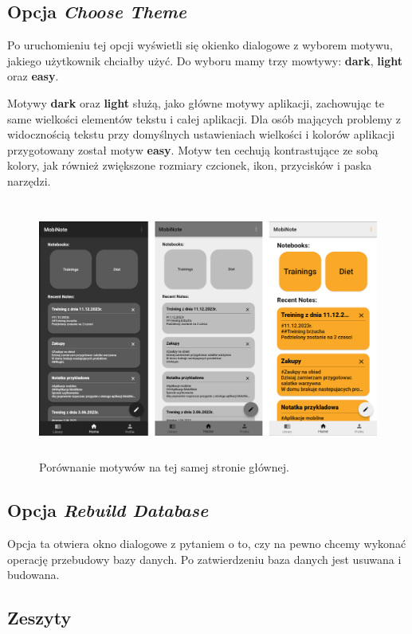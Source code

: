 \subsection{Opcja \textit{Choose Theme}}

Po uruchomieniu tej opcji wyświetli się okienko dialogowe z wyborem motywu, jakiego użytkownik chciałby użyć. Do wyboru mamy trzy mowtywy: \textbf{dark}, \textbf{light} oraz \textbf{easy}.

Motywy \textbf{dark} oraz \textbf{light} służą, jako główne motywy aplikacji, zachowując te same wielkości elementów tekstu i całej aplikacji.
Dla osób mających problemy z widocznością tekstu przy domyślnych ustawieniach wielkości i kolorów aplikacji przygotowany został motyw \textbf{easy}.
Motyw ten cechują kontrastujące ze sobą kolory, jak również zwiększone rozmiary czcionek, ikon, przycisków i paska narzędzi.

\begin{figure}[ht]
    \centering
    \includegraphics[height=8.5cm]{images/strona_domowa_motywy.png}
    \caption{Porównanie motywów na tej samej stronie głównej.}
\end{figure}

\subsection{Opcja \textit{Rebuild Database}}

Opcja ta otwiera okno dialogowe z pytaniem o to, czy na pewno chcemy wykonać operację przebudowy bazy danych. Po zatwierdzeniu baza danych jest usuwana i budowana.

\subsection{Zeszyty}

